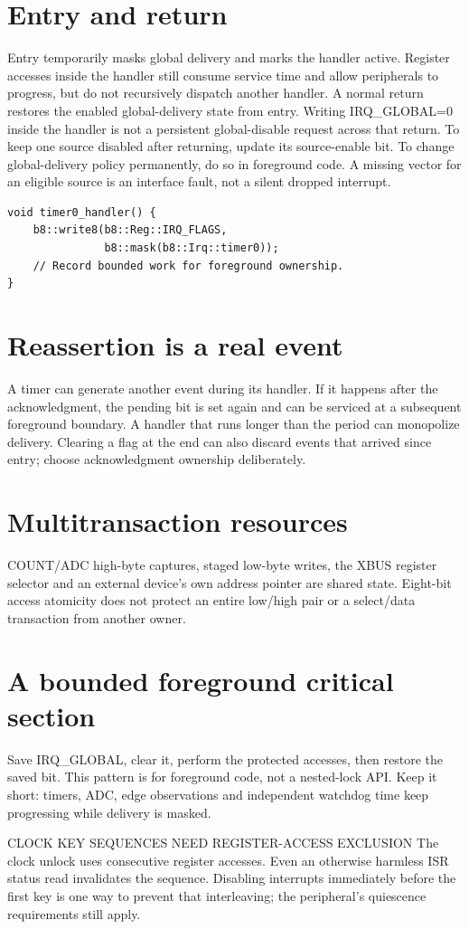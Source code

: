 \documentclass[10pt]{article}
\begin{document}
\newpage
{}

\section*{Entry and return}
Entry temporarily masks global delivery and marks the handler active. Register accesses inside the handler still consume service time and allow peripherals to progress, but do not recursively dispatch another handler. A normal return restores the enabled global-delivery state from entry. Writing IRQ\_GLOBAL=0 inside the handler is not a persistent global-disable request across that return.
To keep one source disabled after returning, update its source-enable bit. To change global-delivery policy permanently, do so in foreground code. A missing vector for an eligible source is an interface fault, not a silent dropped interrupt.
\begin{verbatim}
void timer0_handler() {
    b8::write8(b8::Reg::IRQ_FLAGS,
               b8::mask(b8::Irq::timer0));
    // Record bounded work for foreground ownership.
}
\end{verbatim}
\section*{Reassertion is a real event}
A timer can generate another event during its handler. If it happens after the acknowledgment, the pending bit is set again and can be serviced at a subsequent foreground boundary. A handler that runs longer than the period can monopolize delivery. Clearing a flag at the end can also discard events that arrived since entry; choose acknowledgment ownership deliberately.
\section*{Multitransaction resources}
COUNT/ADC high-byte captures, staged low-byte writes, the XBUS register selector and an external device's own address pointer are shared state. Eight-bit access atomicity does not protect an entire low/high pair or a select/data transaction from another owner.
\section*{A bounded foreground critical section}
Save IRQ\_GLOBAL, clear it, perform the protected accesses, then restore the saved bit. This pattern is for foreground code, not a nested-lock API. Keep it short: timers, ADC, edge observations and independent watchdog time keep progressing while delivery is masked.
\begin{Notice}{CLOCK KEY SEQUENCES NEED REGISTER-ACCESS EXCLUSION}
The clock unlock uses consecutive register accesses. Even an otherwise harmless ISR status read invalidates the sequence. Disabling interrupts immediately before the first key is one way to prevent that interleaving; the peripheral's quiescence requirements still apply.
\end{Notice}
\end{document}
